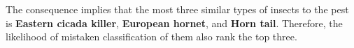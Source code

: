 
The consequence implies that the most three similar types of insects to the pest is \textbf{Eastern cicada killer}, \textbf{European hornet}, and \textbf{Horn tail}. Therefore, the likelihood of mistaken classification of them also rank the top three. 

\vspace{1cm}